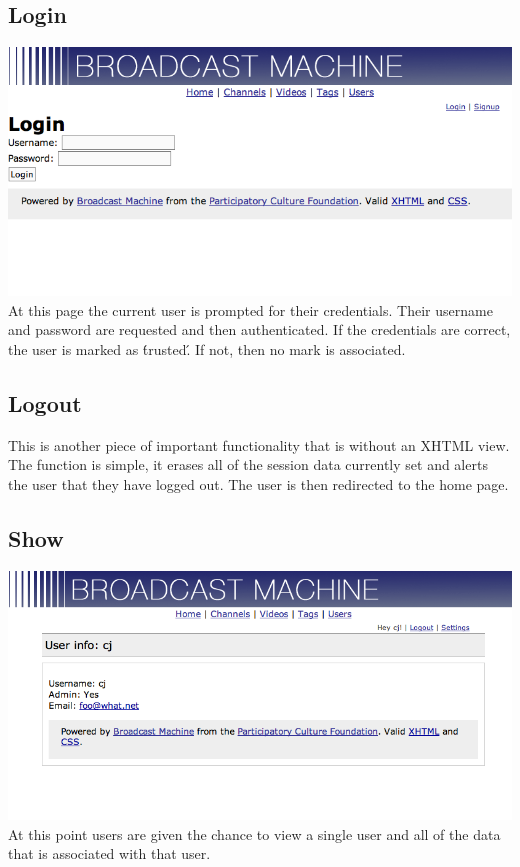 \documentclass[a4paper,12pt]{report}
\begin{document}
\subsection{Login}
\includegraphics{images/userlogin.png}
At this page the current user is prompted for their credentials.
Their username and password are requested and then authenticated.
If the credentials are correct, the user is marked as \'trusted\'.
If not, then no mark is associated.

\subsection{Logout}
This is another piece of important functionality that is without an XHTML view.
The function is simple, it erases all of the session data currently set and alerts the user that they have logged out.
The user is then redirected to the home page.

\subsection{Show}
\includegraphics{images/usershow.png}
At this point users are given the chance to view a single user and all of the data that is associated with that user.
\end{document}
